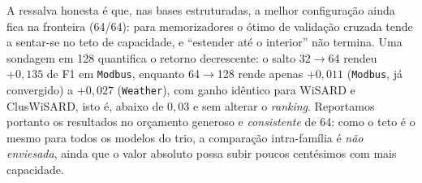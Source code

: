 A ressalva honesta é que, nas bases estruturadas, a melhor
configuração ainda fica na fronteira (64/64): para memorizadores o
ótimo de validação cruzada tende a sentar-se no teto de capacidade, e
``estender até o interior'' não termina. Uma sondagem em 128 quantifica
o retorno decrescente: o salto 32$\rightarrow$64 rendeu $+0{,}135$ de
F1 em \texttt{Modbus}, enquanto 64$\rightarrow$128 rende apenas
$+0{,}011$ (\texttt{Modbus}, já convergido) a $+0{,}027$
(\texttt{Weather}), com ganho idêntico para WiSARD e ClusWiSARD,
isto é, abaixo de $0{,}03$ e sem alterar o \emph{ranking}. Reportamos
portanto os resultados no orçamento generoso e \emph{consistente} de
64: como o teto é o mesmo para todos os modelos do trio, a comparação
intra-família é \emph{não enviesada}, ainda que o valor absoluto possa
subir poucos centésimos com mais capacidade.
